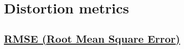 \documentclass{article}
\begin{document}




  
\section{Distortion metrics}

\subsection{\href{https://en.wikipedia.org/wiki/Root_mean_square_deviation}{RMSE (Root Mean
    Square Error)}}
\end{document}
